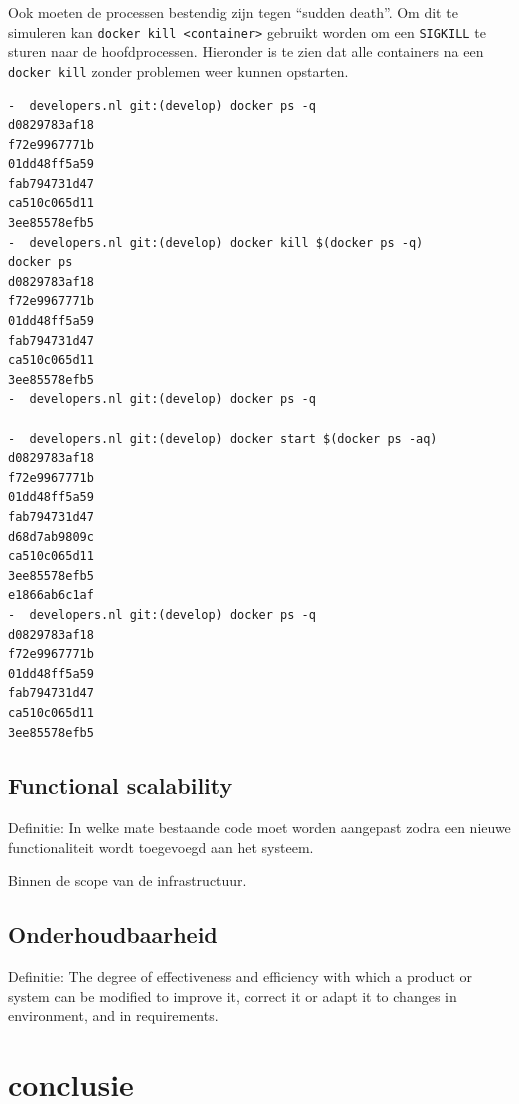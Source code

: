 Ook moeten de processen bestendig zijn tegen \enquote{sudden death}. Om dit te simuleren kan \texttt{docker kill <container>} gebruikt worden om een \texttt{SIGKILL} te sturen naar de hoofdprocessen. Hieronder is te zien dat alle containers na een \texttt{docker kill} zonder problemen weer kunnen opstarten.

\begin{verbatim}
-  developers.nl git:(develop) docker ps -q
d0829783af18
f72e9967771b
01dd48ff5a59
fab794731d47
ca510c065d11
3ee85578efb5
-  developers.nl git:(develop) docker kill $(docker ps -q) 
docker ps
d0829783af18
f72e9967771b
01dd48ff5a59
fab794731d47
ca510c065d11
3ee85578efb5
-  developers.nl git:(develop) docker ps -q

-  developers.nl git:(develop) docker start $(docker ps -aq)
d0829783af18
f72e9967771b
01dd48ff5a59
fab794731d47
d68d7ab9809c
ca510c065d11
3ee85578efb5
e1866ab6c1af
-  developers.nl git:(develop) docker ps -q
d0829783af18
f72e9967771b
01dd48ff5a59
fab794731d47
ca510c065d11
3ee85578efb5
\end{verbatim}

\subsection{Functional scalability}
Definitie: In welke mate bestaande code moet worden aangepast zodra een nieuwe functionaliteit wordt toegevoegd aan het systeem.

Binnen de scope van de infrastructuur.

\subsection{Onderhoudbaarheid}
Definitie: The degree of effectiveness and efficiency with which a product or system can be modified to improve it, correct it or adapt it to changes in environment, and in requirements.

\section{conclusie}
